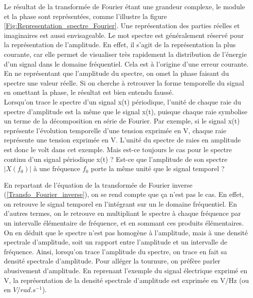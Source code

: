 	Le résultat de la transformée de Fourier étant une grandeur complexe, le module et la phase sont représentées, comme l'illustre la figure \ref{Fig:Representation_spectre_Fourier}. Une représentation des parties réelles et imaginaires est aussi envisageable. Le mot spectre est généralement réservé pour la représentation de l'amplitude. En effet, il s'agit de la représentation la plus courante, car elle permet de visualiser très rapidement la distribution de l'énergie d'un signal dans le domaine fréquentiel. Cela est à l'origine d'une erreur courante. En ne représentant que l'amplitude du spectre, on omet la phase faisant du spectre une valeur réelle. Si on cherche à retrouver la forme temporelle du signal en omettant la phase, le résultat est bien entendu faussé.\\
	
	Lorsqu'on trace le spectre d'un signal x(t) périodique, l'unité de chaque raie du spectre d'amplitude est la même que le signal x(t), puisque chaque raie symbolise un terme de la décomposition en série de Fourier. Par exemple, si le signal x(t) représente l'évolution temporelle d'une tension exprimée en V, chaque raie représente une tension exprimée en V. L'unité du spectre de raies en amplitude est donc le volt dans cet exemple. Mais est-ce toujours le cas pour le spectre continu d'un signal périodique x(t) ? Est-ce que l'amplitude de son spectre $|X(f_0)|$ à une fréquence $f_0$ porte la même unité que le signal temporel ?
	
	En repartant de l'équation de la transformée de Fourier inverse (\ref{Transfo_Fourier_inverse}), on se rend compte que ça n'est pas le cas. En effet, on retrouve le signal temporel en l'intégrant sur un le domaine fréquentiel. En d'autres termes, on le retrouve en multipliant le spectre à chaque fréquence par un intervalle élémentaire de fréquence, et en sommant ces produits élémentaires. On en déduit que le spectre n'est pas homogène à l'amplitude, mais à une densité spectrale d'amplitude, soit un rapport entre l'amplitude et un intervalle de fréquence. Ainsi, lorsqu'on trace l'amplitude du spectre, on trace en fait sa densité spectrale d'amplitude. Pour alléger la tournure, on préfère parler abusivement d'amplitude. En reprenant l'exemple du signal électrique exprimé en V, la représentation de la densité spectrale d'amplitude est exprimée en V/Hz (ou en $V/rad.s^{-1}$). 
	
